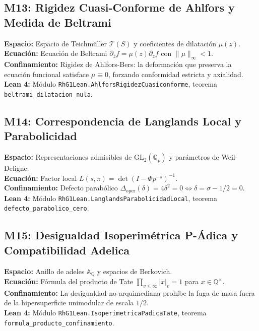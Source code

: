\documentclass[11pt,a4paper]{article}
\begin{document}
\subsection{M13: Rigidez Cuasi-Conforme de Ahlfors y Medida de Beltrami}
\textbf{Espacio:} Espacio de Teichmüller $\mathcal{T}(S)$ y coeficientes de dilatación $\mu(z)$.\\
\textbf{Ecuación:} Ecuación de Beltrami $\partial_{\bar{z}} f = \mu(z) \partial_z f$ con $\|\mu\|_\infty < 1$.\\
\textbf{Confinamiento:} Rigidez de Ahlfors-Bers: la deformación que preserva la ecuación funcional satisface $\mu \equiv 0$, forzando conformidad estricta y axialidad.\\
\textbf{Lean 4:} Módulo \texttt{RhG1Lean.AhlforsRigidezCuasiconforme}, teorema \texttt{beltrami\_dilatacion\_nula}.

\subsection{M14: Correspondencia de Langlands Local y Parabolicidad}
\textbf{Espacio:} Representaciones admisibles de $\mathrm{GL}_2(\mathbb{Q}_p)$ y parámetros de Weil-Deligne.\\
\textbf{Ecuación:} Factor local $L(s, \pi) = \det(I - \Phi p^{-s})^{-1}$.\\
\textbf{Confinamiento:} Defecto parabólico $\Delta_{\text{oper}}(\delta) = 4\delta^2 = 0 \iff \delta = \sigma - 1/2 = 0$.\\
\textbf{Lean 4:} Módulo \texttt{RhG1Lean.LanglandsParabolicidadLocal}, teorema \texttt{defecto\_parabolico\_cero}.

\subsection{M15: Desigualdad Isoperimétrica P-Ádica y Compatibilidad Adelica}
\textbf{Espacio:} Anillo de adeles $\mathbb{A}_{\mathbb{Q}}$ y espacios de Berkovich.\\
\textbf{Ecuación:} Fórmula del producto de Tate $\prod_{v \le \infty} |x|_v = 1$ para $x \in \mathbb{Q}^\times$.\\
\textbf{Confinamiento:} La desigualdad no arquimediana prohíbe la fuga de masa fuera de la hipersuperficie unimodular de escala $1/2$.\\
\textbf{Lean 4:} Módulo \texttt{RhG1Lean.IsoperimetricaPadicaTate}, teorema \texttt{formula\_producto\_confinamiento}.
\end{document}
